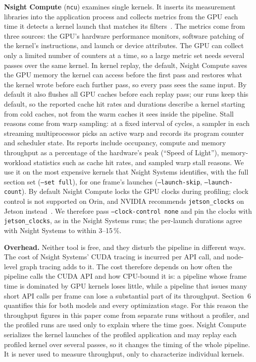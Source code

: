 \textbf{Nsight Compute} (\texttt{ncu}) examines single kernels. It inserts
its measurement libraries into the application process and collects metrics
from the GPU each time it detects a kernel launch that matches its filters~\cite{nvidia-ncu-guide}. The metrics come from three sources: the GPU's
hardware performance monitors, software patching of the kernel's
instructions, and launch or device attributes. The
GPU can collect only a limited number of counters at a time, so a large
metric set needs several passes over the same kernel. In kernel replay, the
default, Nsight Compute saves the GPU memory the kernel can access before the
first pass and restores what the kernel wrote before each further pass, so
every pass sees the same input. By default it also
flushes all GPU caches before each replay pass; our
runs keep this default, so the reported cache hit rates and durations describe
a kernel starting from cold caches, not from the warm caches it sees inside
the pipeline. Stall reasons come from warp sampling: at a fixed interval of
cycles, a sampler in each streaming multiprocessor picks an active warp and
records its program counter and scheduler state.
Its reports include occupancy, compute and memory
throughput as a percentage of the hardware's peak (``Speed of Light''),
memory-workload statistics such as cache hit rates, and sampled warp stall
reasons. We use it on the most expensive kernels that Nsight Systems
identifies, with the full section set (\texttt{--set full}), for one frame's
launches (\texttt{--launch-skip}, \texttt{--launch-count}). By default
Nsight Compute locks the GPU clocks during profiling; clock control is not
supported on Orin, and NVIDIA recommends \texttt{jetson\_clocks} on Jetson
instead~\cite{nvidia-ncu-cli}. We therefore pass
\texttt{--clock-control none} and pin the clocks with \texttt{jetson\_clocks},
as in the Nsight Systems runs; the per-launch durations agree with Nsight
Systems to within 3--15\,\%.

\textbf{Overhead.} Neither tool is free, and they disturb the pipeline in
different ways. The cost of Nsight Systems' CUDA tracing is incurred per API
call, and node-level graph tracing adds to it. The
cost therefore depends on how often the pipeline calls the CUDA API and how
CPU-bound it is: a pipeline whose frame time is dominated by GPU kernels loses
little, while a pipeline that issues many short API calls per frame can lose a
substantial part of its throughput. Section~6 quantifies this for both models
and every optimization stage. %
For this reason the throughput figures in this paper come from separate runs
without a profiler, and the profiled runs are used only to explain where the
time goes. Nsight Compute serializes the kernel launches of the profiled
application and may replay each profiled kernel over several passes, so it changes the timing of the whole pipeline. It
is never used to measure throughput, only to characterize individual
kernels.

